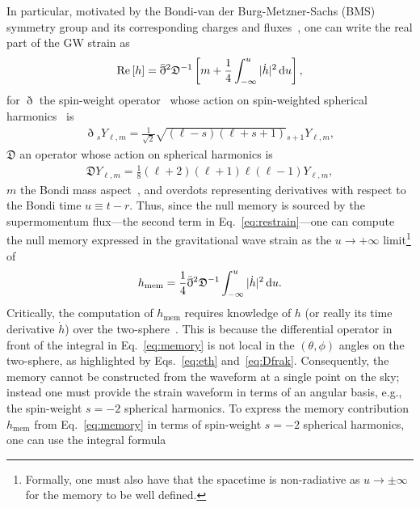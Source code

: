 \documentclass[aps,prd,reprint,twocolumn,10pt,eqsecnum,showpacs,nofootinbib,amsfonts,amssymb,amsmath,longbibliography,superscriptaddress,floatfix]{revtex4-1}
\begin{document}
\begin{widetext}
\noindent In particular, motivated by the Bondi-van der Burg-Metzner-Sachs (BMS) symmetry group and its corresponding charges and fluxes~\cite{Wald:1999wa,Flanagan:2015pxa,Mitman:2020pbt}, one can write the real part of the GW strain as
\begin{align}
	\label{eq:restrain}
	\mathrm{Re}\left[h\right]=\bar{\eth}^{2}\mathfrak{D}^{-1}\left[m+\frac{1}{4}\int_{-\infty}^{u}|\dot{h}|^{2}\,{\rm d}u\right],
\end{align}
for $\eth$ the spin-weight operator~\cite{Newman:1961qr,Goldberg:1966uu,Geroch:1973am} whose action on spin-weighted spherical harmonics~\cite{Goldberg:1966uu} is
\begin{align}
	\label{eq:eth}
	\eth\phantom{}_{s}Y_{\ell,m}=\frac{1}{\sqrt{2}}\sqrt{(\ell-s)(\ell+s+1)}\phantom{}_{s+1}Y_{\ell,m},
\end{align}
$\mathfrak{D}$ an operator whose action on spherical harmonics is
\begin{align}
	\label{eq:Dfrak}
	\mathfrak{D}Y_{\ell,m}=\frac{1}{8}(\ell+2)(\ell+1)\ell(\ell-1)Y_{\ell,m},
\end{align}
$m$ the Bondi mass aspect~\cite{Bondi:1962px}, and overdots representing derivatives with respect to the Bondi time $u\equiv t-r$. Thus, since the null memory is sourced by the supermomentum flux---the second term in Eq.~\eqref{eq:restrain}---one can compute the null memory expressed in the gravitational wave strain as the $u\rightarrow+\infty$ limit\footnote{Formally, one must also have that the spacetime is non-radiative as $u\rightarrow\pm\infty$ for the memory to be well defined.} of
\begin{align}
	\label{eq:memory}
	h_{\mathrm{mem}}=\frac{1}{4}\bar{\eth}^{2}\mathfrak{D}^{-1}\int_{-\infty}^{u}|\dot{h}|^{2}\,{\rm d}u.
\end{align}
Critically, the computation of $h_{\mathrm{mem}}$ requires knowledge of $h$ (or really its time derivative $\dot{h}$) over the two-sphere~\cite{Wiseman:1991ss,PhysRevD.45.520}. This is because the differential operator in front of the integral in Eq.~\eqref{eq:memory} is not local in the $(\theta,\phi)$ angles on the two-sphere, as highlighted by Eqs.~\eqref{eq:eth} and~\eqref{eq:Dfrak}. Consequently, the memory cannot be constructed from the waveform at a single point on the sky; instead one must provide the strain waveform in terms of an angular basis, e.g., the spin-weight $s=-2$ spherical harmonics. To express the memory contribution $h_{\mathrm{mem}}$ from Eq.~\eqref{eq:memory} in terms of spin-weight $s=-2$ spherical harmonics, one can use the integral formula

\end{widetext}
\end{document}
